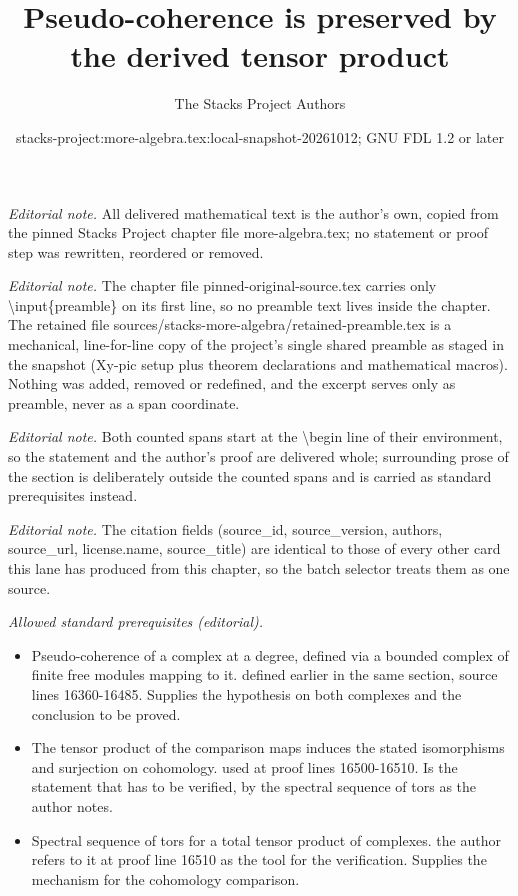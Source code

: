 \documentclass[10pt,a4paper]{amsart}
\title{Pseudo-coherence is preserved by the derived tensor product}
\author{The Stacks Project Authors}
\date{stacks-project:more-algebra.tex:local-snapshot-20261012; GNU FDL 1.2 or later}
\theoremstyle{plain}
\theoremstyle{definition}
\theoremstyle{remark}
\numberwithin{equation}{subsection}
\begin{document}
\maketitle
\setcounter{subsection}{1}
\noindent\textit{Editorial note.} All delivered mathematical text is the author's own, copied from the pinned Stacks Project chapter file more-algebra.tex; no statement or proof step was rewritten, reordered or removed.\par\medskip
\noindent\textit{Editorial note.} The chapter file pinned-original-source.tex carries only \textbackslash{}input\{preamble\} on its first line, so no preamble text lives inside the chapter. The retained file sources/stacks-more-algebra/retained-preamble.tex is a mechanical, line-for-line copy of the project's single shared preamble as staged in the snapshot (Xy-pic setup plus theorem declarations and mathematical macros). Nothing was added, removed or redefined, and the excerpt serves only as preamble, never as a span coordinate.\par\medskip
\noindent\textit{Editorial note.} Both counted spans start at the \textbackslash{}begin line of their environment, so the statement and the author's proof are delivered whole; surrounding prose of the section is deliberately outside the counted spans and is carried as standard prerequisites instead.\par\medskip
\noindent\textit{Editorial note.} The citation fields (source\_id, source\_version, authors, source\_url, license.name, source\_title) are identical to those of every other card this lane has produced from this chapter, so the batch selector treats them as one source.\par\medskip
\noindent\textit{Allowed standard prerequisites (editorial).}\begin{itemize}
\item Pseudo-coherence of a complex at a degree, defined via a bounded complex of finite free modules mapping to it. defined earlier in the same section, source lines 16360-16485. Supplies the hypothesis on both complexes and the conclusion to be proved.
\item The tensor product of the comparison maps induces the stated isomorphisms and surjection on cohomology. used at proof lines 16500-16510. Is the statement that has to be verified, by the spectral sequence of tors as the author notes.
\item Spectral sequence of tors for a total tensor product of complexes. the author refers to it at proof line 16510 as the tool for the verification. Supplies the mechanism for the cohomology comparison.
\end{itemize}\medskip
\end{document}
